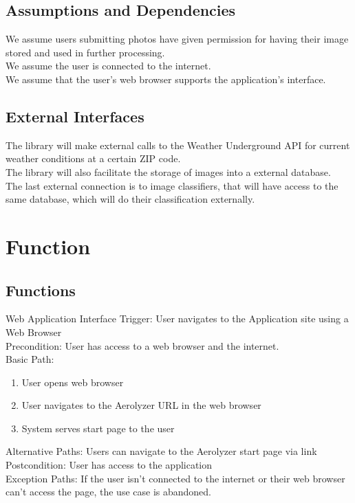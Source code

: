 \documentclass[journal,10pt,draftclsnofoot,onecolumn]{IEEEtran}
\makeatletter
\renewcommand\subsubsection{\@startsection{subsubsection}{3}{\z@}
                                     {-3.25ex\@plus -1ex \@minus -.2ex}
                                     {-1.5ex \@plus -.2ex}
                                     {\normalfont\normalsize\bfseries}}
\makeatother
\begin{document}
\begin{singlespace}
	\subsection{Assumptions and Dependencies}
		We assume users submitting photos have given permission for having their image stored and used in further processing.\\
		We assume the user is connected to the internet.\\
		We assume that the user's web browser supports the application's interface.\\


	\subsection{External Interfaces}
		The library will make external calls to the Weather Underground API for current weather conditions at a certain ZIP code.\\
		The library will also facilitate the storage of images into a external database.\\
		The last external connection is to image classifiers, that will have access to the same database, which will do their classification externally.

\clearpage

\section{Function}
	\subsection{Functions}
		\subsubsection{Web Application Interface}
			Trigger: User navigates to the Application site using a Web Browser\\
			Precondition: User has access to a web browser and the internet.\\
			Basic Path:
			\begin{enumerate}
				\item User opens web browser
				\item User navigates to the Aerolyzer URL in the web browser
				\item System serves start page to the user
			\end{enumerate}
			Alternative Paths: Users can navigate to the Aerolyzer start page via link\\
			Postcondition: User has access to the application\\
			Exception Paths: If the user isn't connected to the internet or their web browser can't access the page, the use case is abandoned.
		

\end{singlespace}
\end{document}
